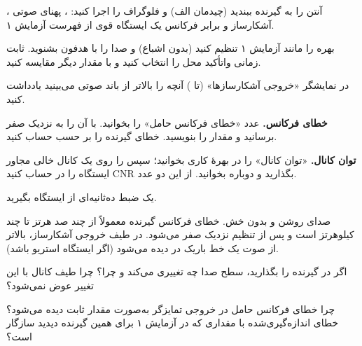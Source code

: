 \documentclass[a4paper,11pt]{article}
\begin{document}
\label{part:rx1}
\begin{steps}
\item آنتن را به گیرنده ببندید (چیدمان الف) و فلوگراف
را اجرا کنید:
،
پهنای صوتی
،
آشکارساز
و
برابر فرکانس یک ایستگاه قوی از فهرست آزمایش ۱.
\item بهره را مانند آزمایش ۱ تنظیم کنید (بدون اشباع) و صدا را با هدفون بشنوید. ثابت زمانی واتأکید محل را انتخاب کنید و با مقدار دیگر مقایسه کنید.
\item در نمایشگر «خروجی آشکارسازها» (تا
)
آنچه را بالاتر از باند صوتی می‌بینید یادداشت کنید.
\item \textbf{خطای فرکانس.} عدد «خطای فرکانس حامل» را بخوانید. با
آن را به نزدیک صفر برسانید و مقدار
را بنویسید. خطای گیرنده را بر حسب
حساب کنید.
\item \textbf{توان کانال.} «توان کانال» را در بهرهٔ کاری بخوانید؛ سپس
را روی یک کانال خالی مجاور بگذارید و دوباره بخوانید. از این دو عدد
$\mathrm{CNR}$
ایستگاه را در
حساب کنید.
\item یک ضبط ده‌ثانیه‌ای از ایستگاه بگیرید.
\end{steps}

\begin{expectbox}
صدای روشن و بدون خش. خطای فرکانس گیرنده معمولاً از چند صد هرتز تا چند کیلوهرتز است و پس از تنظیم
نزدیک صفر می‌شود. در طیف خروجی آشکارساز، بالاتر از صوت یک خط باریک در
دیده می‌شود (اگر ایستگاه استریو باشد).
\end{expectbox}

\begin{question}
اگر در گیرنده
را
بگذارید، سطح صدا چه تغییری می‌کند و چرا؟ چرا طیف
کانال با این تغییر عوض نمی‌شود؟
\end{question}
\begin{question}
چرا خطای فرکانس حامل در خروجی تمایزگر به‌صورت مقدار ثابت دیده می‌شود؟ خطای اندازه‌گیری‌شده با مقداری که در آزمایش ۱ برای همین گیرنده دیدید سازگار است؟
\end{question}
\end{document}
